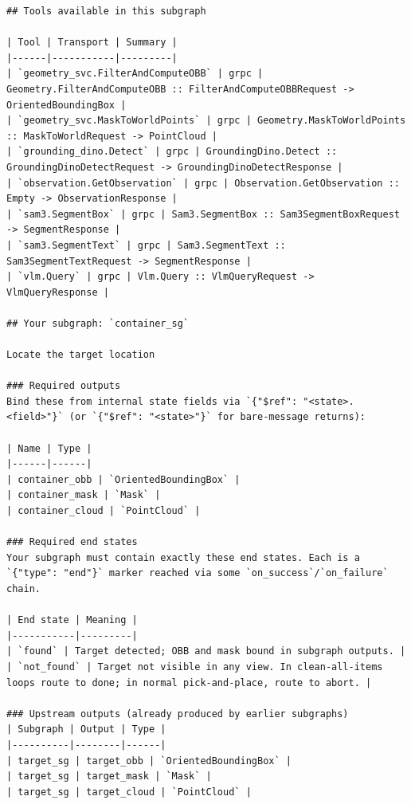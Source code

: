 \begin{lstlisting}
## Tools available in this subgraph

| Tool | Transport | Summary |
|------|-----------|---------|
| `geometry_svc.FilterAndComputeOBB` | grpc | Geometry.FilterAndComputeOBB :: FilterAndComputeOBBRequest -> OrientedBoundingBox |
| `geometry_svc.MaskToWorldPoints` | grpc | Geometry.MaskToWorldPoints :: MaskToWorldRequest -> PointCloud |
| `grounding_dino.Detect` | grpc | GroundingDino.Detect :: GroundingDinoDetectRequest -> GroundingDinoDetectResponse |
| `observation.GetObservation` | grpc | Observation.GetObservation :: Empty -> ObservationResponse |
| `sam3.SegmentBox` | grpc | Sam3.SegmentBox :: Sam3SegmentBoxRequest -> SegmentResponse |
| `sam3.SegmentText` | grpc | Sam3.SegmentText :: Sam3SegmentTextRequest -> SegmentResponse |
| `vlm.Query` | grpc | Vlm.Query :: VlmQueryRequest -> VlmQueryResponse |

## Your subgraph: `container_sg`

Locate the target location

### Required outputs
Bind these from internal state fields via `{"$ref": "<state>.<field>"}` (or `{"$ref": "<state>"}` for bare-message returns):

| Name | Type |
|------|------|
| container_obb | `OrientedBoundingBox` |
| container_mask | `Mask` |
| container_cloud | `PointCloud` |

### Required end states
Your subgraph must contain exactly these end states. Each is a `{"type": "end"}` marker reached via some `on_success`/`on_failure` chain.

| End state | Meaning |
|-----------|---------|
| `found` | Target detected; OBB and mask bound in subgraph outputs. |
| `not_found` | Target not visible in any view. In clean-all-items loops route to done; in normal pick-and-place, route to abort. |

### Upstream outputs (already produced by earlier subgraphs)
| Subgraph | Output | Type |
|----------|--------|------|
| target_sg | target_obb | `OrientedBoundingBox` |
| target_sg | target_mask | `Mask` |
| target_sg | target_cloud | `PointCloud` |
\end{lstlisting}